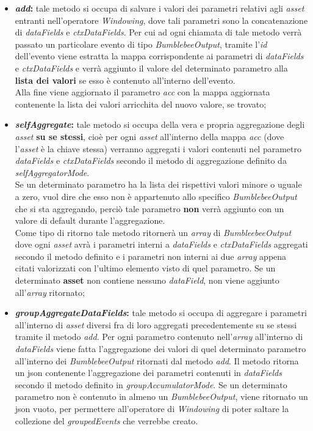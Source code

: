 \begin{itemize}
	\item{\textbf{\textit{add}:} tale metodo si occupa di salvare i valori dei parametri relativi agli \textit{asset} entranti nell'operatore \textit{Windowing}, dove tali parametri sono la concatenazione di \textit{dataFields} e \textit{ctxDataFields}. Per cui ad ogni chiamata di tale metodo verrà passato un particolare evento di tipo \textit{BumblebeeOutput}, tramite l'\textit{id} dell'evento viene estratta la mappa corrispondente ai parametri di \textit{dataFields} e \textit{ctxDataFields} e verrà aggiunto il valore del determinato parametro alla \textbf{lista dei valori} se esso è contenuto all'interno dell'evento.\\
Alla fine viene aggiornato il parametro \textit{acc} con la mappa aggiornata contenente la lista dei valori arricchita del nuovo valore, se trovato;}
	\item{\textbf{\textit{selfAggregate}:} tale metodo si occupa della vera e propria aggregazione degli \textit{asset} \textbf{su se stessi}, cioè per ogni \textit{asset} all'interno della mappa \textit{acc} (dove l'\textit{asset} è la chiave stessa) verranno aggregati i valori contenuti nel parametro \textit{dataFields} e \textit{ctxDataFields} secondo il metodo di aggregazione definito da \textit{selfAggregatorMode}.\\
	Se un determinato parametro ha la lista dei rispettivi valori minore o uguale a zero, vuol dire che esso non è appartenuto allo specifico \textit{BumblebeeOutput} che si sta aggregando, perciò tale parametro \textbf{non} verrà aggiunto con un valore di default durante l'aggregazione.\\
	Come tipo di ritorno tale metodo ritornerà un \textit{array} di \textit{BumbleebeeOutput} dove ogni \textit{asset} avrà i parametri interni a \textit{dataFields} e \textit{ctxDataFields} aggregati secondo il metodo definito e i parametri non interni ai due \textit{array} appena citati valorizzati con l'ultimo elemento visto di quel parametro. Se un determinato \textbf{asset} non contiene nessuno \textit{dataField}, non viene aggiunto all'\textit{array} ritornato;}
	\item{\textbf{\textit{groupAggregateDataFields}:} tale metodo si occupa di aggregare i parametri all'interno di \textit{asset} diversi fra di loro aggregati precedentemente su se stessi tramite il metodo \textit{add}. Per ogni parametro contenuto nell'\textit{array} all'interno di \textit{dataFields} viene fatta l'aggregazione dei valori di quel determinato parametro all'interno dei \textit{BumblebeeOutput} ritornati dal metodo \textit{add}. Il metodo ritorna un \gls{json} contenente l'aggregazione dei parametri contenuti in \textit{dataFields} secondo il metodo definito in \textit{groupAccumulatorMode}. Se un determinato parametro non è contenuto in almeno un \textit{BumblebeeOutput}, viene ritornato un \gls{json} vuoto, per permettere all'operatore di \textit{Windowing} di poter saltare la collezione del \textit{groupedEvents} che verrebbe creato.}
\end{itemize}




